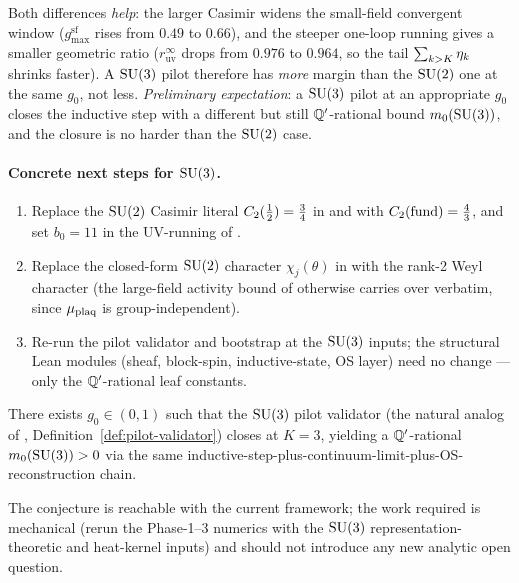 Both differences \emph{help}: the larger Casimir widens the
small-field convergent window ($g_{\max}^{\mathrm{sf}}$ rises from
$0.49$ to $0.66$), and the steeper one-loop running gives a smaller
geometric ratio ($r_{\mathrm{uv}}^\infty$ drops from $0.976$ to
$0.964$, so the tail $\sum_{k>K}\eta_k$ shrinks faster).  A $\mathrm{SU}(3)$
pilot therefore has \emph{more} margin than the $\mathrm{SU}(2)$ one at the
same $g_0$, not less.  \emph{Preliminary expectation}: a $\mathrm{SU}(3)$
pilot at an appropriate $g_0$ closes the inductive step with a
different but still $\mathbb{Q}'$-rational bound $m_0(\mathrm{SU}(3))$, and the
closure is no harder than the $\mathrm{SU}(2)$ case.

\paragraph{Concrete next steps for $\mathrm{SU}(3)$.}
\begin{enumerate}[label=(\roman*)]
  \item Replace the $\mathrm{SU}(2)$ Casimir literal
    $C_2(\tfrac12) = \tfrac34$ in
     and
     with
    $C_2(\mathrm{fund}) = \tfrac43$, and set $b_0 = 11$ in the
    UV-running of .
  \item Replace the closed-form $\mathrm{SU}(2)$ character
    $\chi_j(\theta)$ in  with the
    rank-2 Weyl character (the large-field activity bound of
     otherwise carries over verbatim, since
    $\mu_{\mathrm{plaq}}$ is group-independent).
  \item Re-run the pilot validator and bootstrap at the $\mathrm{SU}(3)$
    inputs; the structural Lean modules (sheaf, block-spin,
    inductive-state, OS layer) need no change --- only the
    $\mathbb{Q}'$-rational leaf constants.
\end{enumerate}

\begin{conjecture}
\label{conj:su3-pilot}
There exists $g_0 \in (0, 1)$ such that the $\mathrm{SU}(3)$ pilot
validator (the natural analog of ,
Definition~\ref{def:pilot-validator}) closes at $K = 3$,
yielding a $\mathbb{Q}'$-rational $m_0(\mathrm{SU}(3)) > 0$ via the same
inductive-step-plus-continuum-limit-plus-OS-reconstruction chain.
\end{conjecture}

The conjecture is reachable with the current framework; the work
required is mechanical (rerun the Phase-1--3 numerics with the
$\mathrm{SU}(3)$ representation-theoretic and heat-kernel inputs) and
should not introduce any new analytic open question.

